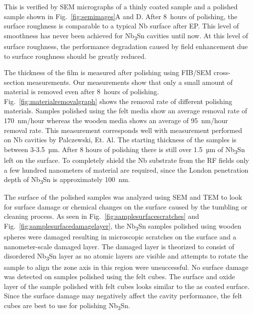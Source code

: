 \documentclass[reprint,amsmath,amssymb,aps]{revtex4-2}%
\begin{document}
This is verified by SEM micrographs of a thinly coated sample and a polished sample shown in Fig.~\ref{fig:semimages}A and D. After 8~hours of polishing, the surface roughness is comparable to a typical Nb surface after EP. This level of smoothness has never been achieved for Nb\textsubscript{3}Sn cavities until now. At this level of surface roughness, the performance degradation caused by field enhancement due to surface roughness should be greatly reduced.

The thickness of the film is measured after polishing using FIB/SEM cross-section measurements. Our measurements show that only a small amount of material is removed even after 8~hours of polishing. Fig.~\ref{fig:materialremovalgraph} shows the removal rate of different polishing materials. Samples polished using the felt media show an average removal rate of 170~nm/hour whereas the wooden media shows an average of 95~nm/hour removal rate. This measurement corresponds well with measurement performed on Nb cavities by Palczewski, Et. Al.\cite{palczewski2013exploration} The starting thickness of the samples is between 3-3.5~µm. After 8 hours of polishing there is still over 1.5~µm of Nb\textsubscript{3}Sn left on the surface. To completely shield the Nb substrate from the RF fields only a few hundred nanometers of material are required, since the London penetration depth of Nb\textsubscript{3}Sn is approximately 100~nm\cite{liarte2017theoretical}.

The surface of the polished samples was analyzed using SEM and TEM to look for surface damage or chemical changes on the surface caused by the tumbling or cleaning process. As seen in Fig.~\ref{fig:samplesurfacescratches} and Fig.~\ref{fig:samplesurfacedamagelayer}, the Nb\textsubscript{3}Sn samples polished using wooden spheres were damaged resulting in microscopic scratches on the surface and a nanometer-scale damaged layer. The damaged layer is theorized to consist of disordered Nb\textsubscript{3}Sn layer as no atomic layers are visible and attempts to rotate the sample to align the zone axis in this region were unsuccessful. No surface damage was detected on samples polished using the felt cubes. The surface and oxide layer of the sample polished with felt cubes looks similar to the as coated surface\cite{sun2023surface,cano2023selective}. Since the surface damage may negatively affect the cavity performance, the felt cubes are best to use for polishing Nb\textsubscript{3}Sn.
%




%
\end{document}
